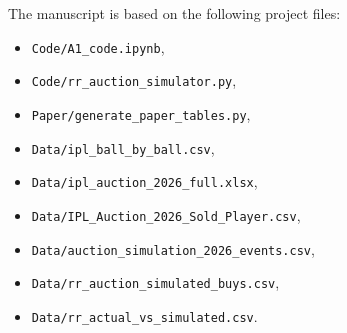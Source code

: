 \documentclass[11pt]{article}
\begin{document}
The manuscript is based on the following project files:
\begin{itemize}[leftmargin=1.5em]
    \item \texttt{Code/A1\_code.ipynb},
    \item \texttt{Code/rr\_auction\_simulator.py},
    \item \texttt{Paper/generate\_paper\_tables.py},
    \item \texttt{Data/ipl\_ball\_by\_ball.csv},
    \item \texttt{Data/ipl\_auction\_2026\_full.xlsx},
    \item \texttt{Data/IPL\_Auction\_2026\_Sold\_Player.csv},
    \item \texttt{Data/auction\_simulation\_2026\_events.csv},
    \item \texttt{Data/rr\_auction\_simulated\_buys.csv},
    \item \texttt{Data/rr\_actual\_vs\_simulated.csv}.
\end{itemize}
\end{document}
